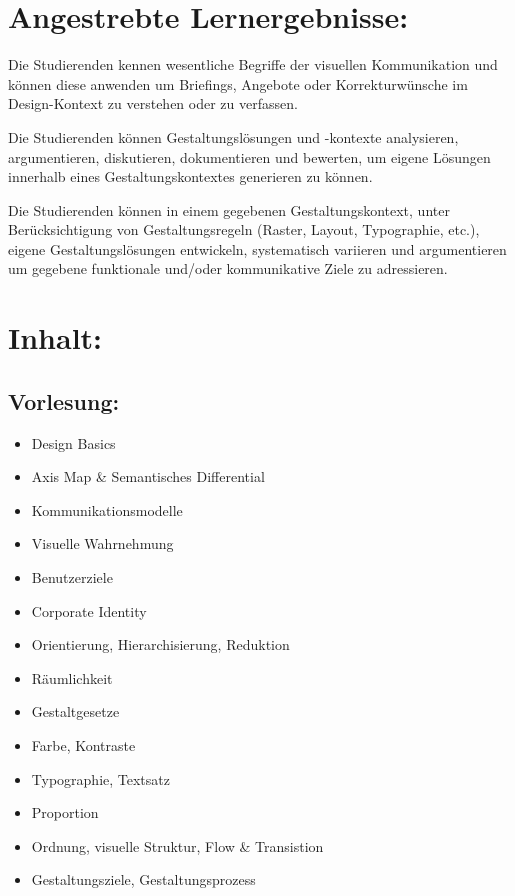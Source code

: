 \section{Angestrebte
Lernergebnisse:}\label{angestrebte-lernergebnisse-25}

Die Studierenden kennen wesentliche Begriffe der visuellen Kommunikation
und können diese anwenden um Briefings, Angebote oder Korrekturwünsche
im Design-Kontext zu verstehen oder zu verfassen.

Die Studierenden können Gestaltungslösungen und -kontexte analysieren,
argumentieren, diskutieren, dokumentieren und bewerten, um eigene
Lösungen innerhalb eines Gestaltungskontextes generieren zu können.

Die Studierenden können in einem gegebenen Gestaltungskontext, unter
Berücksichtigung von Gestaltungsregeln (Raster, Layout, Typographie,
etc.), eigene Gestaltungslösungen entwickeln, systematisch variieren und
argumentieren um gegebene funktionale und/oder kommunikative Ziele zu
adressieren.

\section{Inhalt:}\label{inhalt-25}

\subsection{Vorlesung:}\label{vorlesung}

\begin{itemize}
\tightlist
\item
  Design Basics
\item
  Axis Map \& Semantisches Differential
\item
  Kommunikationsmodelle
\item
  Visuelle Wahrnehmung
\item
  Benutzerziele
\item
  Corporate Identity
\item
  Orientierung, Hierarchisierung, Reduktion
\item
  Räumlichkeit
\item
  Gestaltgesetze
\item
  Farbe, Kontraste
\item
  Typographie, Textsatz
\item
  Proportion
\item
  Ordnung, visuelle Struktur, Flow \& Transistion
\item
  Gestaltungsziele, Gestaltungsprozess
\end{itemize}

